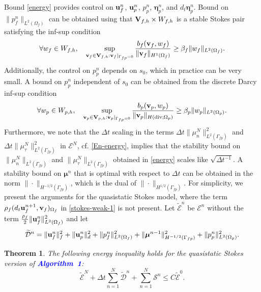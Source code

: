 \documentclass[11pt]{article}
\def\u{{\bf u}}
\def\bv{{\bf v}}
\def\bbeta{\boldsymbol{\eta}}
\def\bmu{\boldsymbol{\mu}}
\def\V{{\bf V}}
\def\O{\Omega}
\def\dt{d_t}
\newtheorem{theorem}{Theorem}[section]
\begin{document}
Bound \eqref{energy} provides control on $\u_{f}^{n}$, $\u_{p}^{n}$, $p_p^n$, 
$\bbeta_{p}^{n}$, and $\dt\bbeta_{p}^n$. Bound on $\|p_f^n\|_{L^2(\Omega_f)}$ can be obtained using that $\V_{f,h}\times W_{f,h}$ is a stable Stokes pair satisfying the inf-sup condition \cite[Lemma~4.1]{LSY}
%
\begin{equation}\label{stokes-inf-sup}
\forall w_f \in W_{f,h}, \quad \sup_{\bv_f \in \V_{f,h}: \bv_f|_{\Gamma_{fp} = 0}} \frac{b_f(\bv_f,w_f)}{\|\bv_f\|_{H^1(\Omega_f)}} \ge \beta_f \|w_f\|_{L^2(\Omega_f)}.
\end{equation}
%
Additionally, the control on $p_p^n$ depends on $s_0$, which in practice can be very small. A bound on $p_p^n$ independent of $s_0$ can be obtained from the discrete Darcy inf-sup condition \cite{boffi2013mixed}
%
\begin{equation}\label{darcy-inf-sup}
\forall w_p \in W_{p,h}, \quad \sup_{\bv_p \in \V_{p,h}: \bv_p|_{\Gamma_{fp} = 0}} \frac{b_p(\bv_p,w_p)}{\|\bv_p\|_{H({\rm div}; \O_{p})}} \ge \beta_p \|w_p\|_{L^2(\Omega_p)}.
\end{equation}
%
Furthermore, we note that the $\Delta t$ scaling in the terms $\Delta t \|\mu_n^N\|_{L^2(\Gamma_{fp})}^2$ and $\Delta t \|\mu_\tau^N\|_{L^2(\Gamma_{fp})}^2$ in $\mathcal{E}^N$, cf. \eqref{En-energy}, implies that the stability bound on $\|\mu_n^N\|_{L^2(\Gamma_{fp})}$ and $\|\mu_\tau^N\|_{L^2(\Gamma_{fp})}$ obtained in \eqref{energy} scales like $\sqrt{\Delta t^{-1}}$. A stability bound on $\bmu^n$ that is optimal with respect to $\Delta t$ can be obtained in the norm $\|\cdot\|_{H^{-1/2}(\Gamma_{fp})}$, which is the dual of $\|\cdot\|_{H^{1/2}(\Gamma_{fp})}$. For simplicity, we present the arguments for the quasistatic Stokes model, where the term $\rho_f (\dt \u_{f}^{n+1},\bv_{f})_{\O_f}$ in \eqref{stokes-weak-1} is not present. Let $\widetilde{\mathcal{E}}^n$ be $\mathcal{E}^n$ without the term $\frac{\rho_f}{2}\|\u_f^n\|_{L^2(\O_f)}^2$ and let
%
$$
\widetilde{\mathcal{D}}^n = \|\u_{f}^n\|_f^2 + \|\u_{p}^n\|_d^2 + \|p_f^{n}\|_{L^2(\Omega_f)}^2 + \|\bmu^{n-1}\|_{H^{-1/2}(\Gamma_{fp})}^2 + \|p_p^{n}\|_{L^2(\Omega_p)}^2.
$$

\begin{theorem}\label{stability-improved}
  The following energy inequality holds for the quasistatic Stokes version of \textcolor{blue}{{\em \bf Algorithm~1}}:
%
\begin{equation}\label{energy-improved}
\widetilde{\mathcal{E}}^N + \Delta t \sum_{n=1}^N \widetilde{\mathcal{D}}^n + \sum_{n=1}^N \mathcal{S}^n \le C\widetilde{\mathcal{E}}^0.
\end{equation}
\end{theorem}
\end{document}
